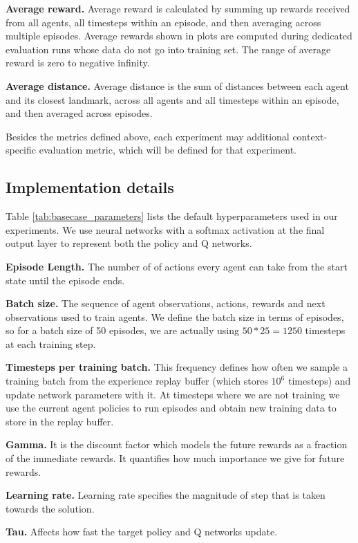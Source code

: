 \documentclass{article}
\begin{document}
\textbf{Average reward.} Average reward is calculated by summing up rewards received from all agents, all timesteps within an episode, and then averaging across multiple episodes. Average rewards shown in plots are computed during dedicated evaluation runs whose data do not go into training set. The range of average reward is zero to negative infinity. 

\textbf{Average distance.} Average distance is the sum of distances between each agent and its closest landmark, across all agents and all timesteps within an episode, and then averaged across episodes.

Besides the metrics defined above, each experiment may additional context-specific evaluation metric, which will be defined for that experiment.


\subsection{Implementation details}

Table \ref{tab:basecase_parameters} lists the default hyperparameters used in our experiments. We use neural networks with a softmax activation at the final output layer to represent both the policy and Q networks.

\textbf{Episode Length.} The number of of actions every agent can take from the start state until the episode ends.

\textbf{Batch size.} The sequence of agent observations, actions, rewards and next observations used to train agents. We define the batch size in terms of episodes, so for a batch size of 50 episodes, we are actually using $50*25 = 1250$ timesteps at each training step.

\textbf{Timesteps per training batch.} This frequency defines how often we sample a training batch from the experience replay buffer (which stores $10^6$ timesteps) and update network parameters with it. At timesteps where we are not training we use the current agent policies to run episodes and obtain new training data to store in the replay buffer.

\textbf{Gamma.} It is the discount factor which models the future rewards as a fraction of the immediate rewards. It quantifies how much importance we give for future rewards.

\textbf{Learning rate.} Learning rate specifies the magnitude of step that is taken towards the solution. 

\textbf{Tau.} Affects how fast the target policy and Q networks update. 
\end{document}
